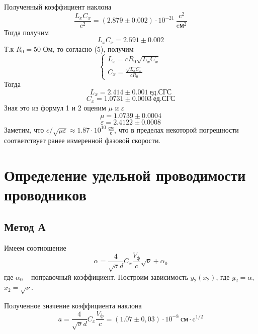 \documentclass[a4paper,12pt]{article}
\theoremstyle{definition}
\begin{document}
	Полученный коэффициент наклона
	$$\frac{L_xC_x}{c^2}=(2.879\pm0.002)\cdot10^{-21}\:\frac{\text{c}^2}{\text{cм}^2}$$
	Тогда получим
	\begin{equation}
		L_xC_x=2.591\pm0.002
	\end{equation}
	Т.к $R_0=50$ Ом, то согласно (5), получим
	\begin{equation}
		\begin{cases}
			L_x=cR_0\sqrt{L_xC_x} \\
			C_x=\frac{\sqrt{L_xC_x}}{cR_0}
		\end{cases}
	\end{equation}
	Тогда
	\begin{equation}
		L_x=2.414\pm0.001\:\text{ед.СГС}
	\end{equation}
	\begin{equation}
		C_x=1.0731\pm0.0003\:\text{ед.СГС}
	\end{equation}
	Зная это из формул 1 и 2 оценим $\mu$ и $\varepsilon$
	\begin{equation}
		\mu=1.0739\pm0.0004
	\end{equation}
	\begin{equation}
		\varepsilon=2.4122\pm0.0008
	\end{equation}
	Заметим, что $c/\sqrt{\mu\varepsilon}\approx1.87\cdot10^{10}\:\frac{\text{см}}{\text{с}}$, что в пределах некоторой погрешности соответствует ранее измеренной фазовой скорости.
	

	\section{Определение удельной проводимости проводников}
	\subsection{Метод А}
	
	Имеем соотношение
	\begin{equation}
		\alpha = \frac{4}{\sqrt{\sigma} d}C_x\frac{V_\text{ф}}{c}\sqrt{\nu}+\alpha_0
	\end{equation}
	где $\alpha_0$ -- поправочный коэффициент. Построим зависимость $y_2(x_2)$, где $y_2=\alpha$, $x_2=\sqrt{\nu}$.
	
	Полученное значение коэффициента наклона
	\begin{equation}
		a=\frac{4}{\sqrt{\sigma} d}C_x\frac{V_\text{ф}}{c}=(1.07\pm0,03)\cdot10^{-8}\:\text{см}\cdot\text{c}^{1/2}
	\end{equation}
\end{document}
